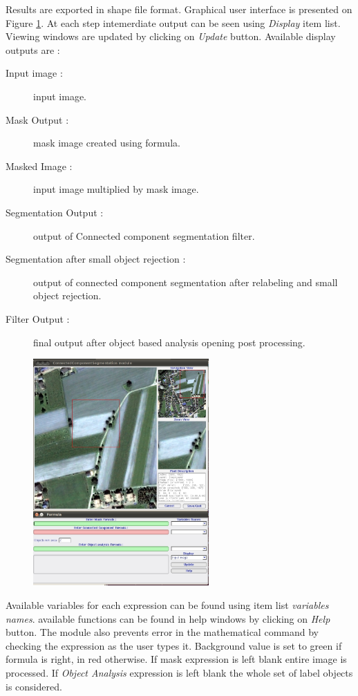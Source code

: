 Results are exported in shape file format. Graphical user interface is presented on Figure \ref{fig:connected_component_module}. At each step intemerdiate output can be seen using \emph{Display} item list. Viewing windows are updated by clicking on \emph{Update} button. Available display outputs are :

\begin{description}
\item[Input image :] input image.
\item[Mask Output :] mask image created using formula.
\item[Masked Image :] input image multiplied by mask image.
\item[Segmentation Output :] output of Connected component segmentation filter.
\item[Segmentation after small object rejection :] output of connected component segmentation after relabeling and small object rejection.
\item[Filter Output :] final output after object based analysis opening post processing. 
\end{description}

\begin{figure}
  \center
  \includegraphics[width=0.6\textwidth]{../Art/MonteverdiImages/monteverdi_connected_component_segmentation.png}
  \label{fig:connected_component_module}
\end{figure}

Available variables for each expression can be found using item list \emph{variables names}. available functions can  be found in help windows by clicking on \emph{Help} button. The module also prevents error in the mathematical command by checking the expression as the user types it. Background value is set to green if formula is right, in red otherwise. If mask expression is left blank entire image is processed. If \emph{Object Analysis} expression is left blank the whole set of label objects is considered.

